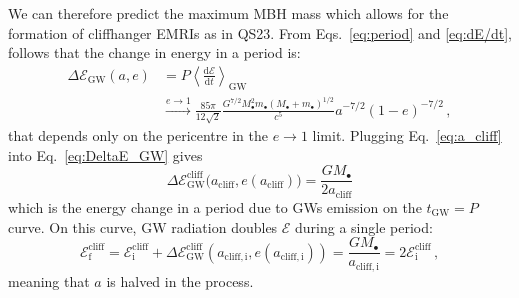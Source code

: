 \documentclass[desactivate]{aa}
\begin{document}
        We can therefore predict the maximum MBH mass which allows for the formation of cliffhanger EMRIs as in QS23. From Eqs.\ \eqref{eq:period} and \eqref{eq:dE/dt}, follows that the change in energy in a period is:
        \begin{equation} \label{eq:DeltaE_GW}
            \begin{aligned}
                \Delta \mathcal{E}_\mathrm{GW} (a,e) &= P \left\langle \frac{\mathrm{d}\mathcal{E}}{\mathrm{d}t } \right\rangle_\mathrm{GW} \\ &\xrightarrow{e \to 1} \frac{85 \pi}{12 \sqrt{2}} \frac{G^{7/2} M_\bullet^2 m_\bullet (M_\bullet + m_\bullet)^{1/2}}{c^5} a^{-7/2} (1-e)^{-7/2} \, ,              
            \end{aligned}
        \end{equation}
        that depends only on the pericentre in the $e\to1$ limit.
        Plugging Eq.\ \eqref{eq:a_cliff} into Eq.\ \eqref{eq:DeltaE_GW} gives
        \begin{equation}
            \Delta \mathcal{E}_\mathrm{GW}^\mathrm{cliff} \big(a_\mathrm{cliff},e(a_\mathrm{cliff})\big) = \frac{GM_\bullet}{2 a_\mathrm{cliff}}
        \end{equation}
        which is the energy change in a period due to GWs emission on the $t_\mathrm{GW} = P$ curve. On this curve, GW radiation doubles $\mathcal{E}$ during a single period:
        \begin{equation} \label{eq:double}
            \mathcal{E}_\mathrm{f}^\mathrm{cliff} = \mathcal{E}_\mathrm{i}^\mathrm{cliff} + \Delta \mathcal{E}_\mathrm{GW}^\mathrm{cliff} \left(a_\mathrm{cliff,i},e(a_\mathrm{cliff,i})\right)  = \frac{GM_\bullet}{a_\mathrm{cliff,i}} = 2 \mathcal{E}_\mathrm{i}^\mathrm{cliff} \, ,
        \end{equation}
        meaning that $a$ is halved in the process.
\end{document}
